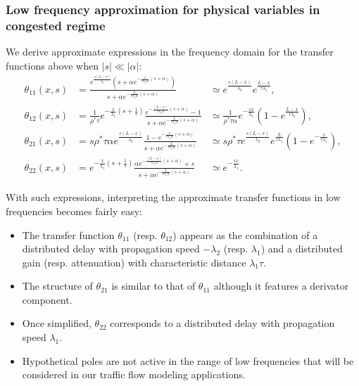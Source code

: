 \documentclass[preprint]{elsarticle}
\begin{document}
\subsubsection{Low frequency approximation for physical variables in congested regime}
We derive approximate expressions in the frequency domain for the transfer functions above when $\left|s\right|\ll\left|\alpha\right|$:
\begin{subequations}
\begin{align}
\theta_{11}\left(x,s\right) &=
\frac{
	e^{\frac{s\left(L-x\right)}{\lambda_{2}}}
	\left(
		s
		+
		\alpha
		e^{
			-\frac{x}{\tau\lambda_{1}\alpha}
			\left(s+\alpha\right)
		}
	\right)
}{
	s
	+
	\alpha
	e^{
		-\frac{L}{\tau\lambda_{1}\alpha}
		\left(s+\alpha\right)
	}
}
&\simeq
e^{\frac{s\left(L-x\right)}{\lambda_{2}}}
e^{\frac{L-x}{\tau\lambda_{1}}},\\
\theta_{12}\left(x,s\right) &=
\frac{1}{\rho^{*}\tau}
e^{-\frac{x}{\lambda_{1}} \left( s + \frac{1}{\tau} \right)}
\frac{
	e^{-\frac{\left(L-x\right)}{\tau\lambda_{1}\alpha}\left(s+\alpha\right)}
	-1
}{
	s
	+
	\alpha
	e^{
		-\frac{L}{\tau\lambda_{1}\alpha}
		\left(s+\alpha\right)
	}
}
&\simeq
\frac{1}{\rho^{*}\tau\alpha}
e^{-\frac{sx}{\lambda_{1}}}
\left(
	1 - e^{\frac{L-x}{\tau\lambda_{1}}}
\right),\\
\theta_{21}\left(x,s\right) &=
s \rho^{*}\tau\alpha
e^{\frac{s\left(L-x\right)}{\lambda_{2}}}
\frac{
	1 - 
	e^{-\frac{x}{\tau\lambda_{1}\alpha}\left(s+\alpha\right)}
}{
	s
	+
	\alpha
	e^{
		-\frac{L}{\tau\lambda_{1}\alpha}
		\left(s+\alpha\right)
	}
}
&\simeq
s \rho^{*}\tau
e^{\frac{s\left(L-x\right)}{\lambda_{2}}}
e^{\frac{L}{\tau\lambda_{1}}}
\left(
	1 - e^{-\frac{x}{\tau\lambda_{1}}}
\right),\\
\theta_{22}\left(x,s\right) &=
e^{-\frac{x}{\lambda_{1}} \left( s + \frac{1}{\tau} \right)}
\frac{
	\alpha e^{-\frac{\left(L-x\right)}{\tau\lambda_{1}\alpha}\left(s+\alpha\right)}
	+ s
}{
	s
	+
	\alpha
	e^{
		-\frac{L}{\tau\lambda_{1}\alpha}
		\left(s+\alpha\right)
	}
}
&\simeq
e^{-\frac{sx}{\lambda_{1}}}.
\end{align}
\end{subequations}

With such expressions, interpreting the approximate transfer functions in low frequencies becomes fairly easy:
\begin{itemize}
\item The transfer function $\theta_{11}$ (resp. $\theta_{12}$) appears as the combination of a distributed delay with propagation speed $-\lambda_{2}$ (resp. $\lambda_{1}$) and a distributed gain (resp. attenuation) with characteristic distance $\lambda_{1}\tau$.
\item The structure of $\theta_{21}$ is similar to that of $\theta_{11}$ although it features a derivator component.
\item Once simplified, $\theta_{22}$ corresponds to a distributed delay with propagation speed $\lambda_{1}$.
\item Hypothetical poles are not active in the range of low frequencies that will be considered in our traffic flow modeling applications.
\end{itemize}
\end{document}
